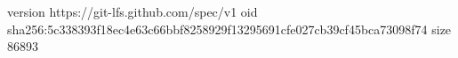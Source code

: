 version https://git-lfs.github.com/spec/v1
oid sha256:5c338393f18ec4e63c66bbf8258929f13295691cfe027cb39cf45bca73098f74
size 86893
